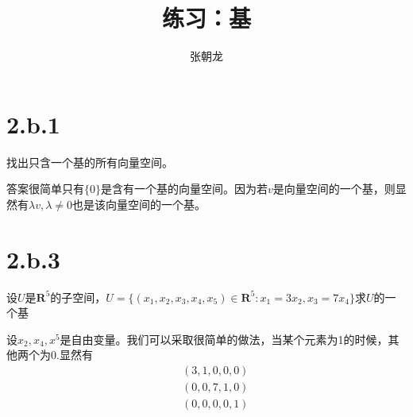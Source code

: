 \documentclass[10pt,a4paper,UTF8]{article}
\author{张朝龙}
\date{}
\title{练习：基}
\begin{document}
\maketitle
\tableofcontents
{}


\section*{2.b.1}
\label{sec:orgeb37aa7}


\begin{problem}
找出只含一个基的所有向量空间。
\end{problem}

\begin{answer}
答案很简单只有\(\{0\}\)是含有一个基的向量空间。因为若\(v\)是向量空间的一个基，则显然有\(\lambda v,\lambda \neq 0\)也是该向量空间的一个基。
\end{answer}
\section*{2.b.3}
\label{sec:org1222308}


\begin{problem}
设\(U\)是\(\mathbf{R}^{5}\)的子空间，\(U=\{(x_{1},x_{2},x_{3},x_{4},x_{5})\in \mathbf{R}^{5}:x_{1}=3x_{2},x_{3}=7x_{4}\}\)求\(U\)的一个基
\end{problem}

\begin{answer}
设\(x_{2},x_{4},x^{5}\)是自由变量。我们可以采取很简单的做法，当某个元素为1的时候，其他两个为0.显然有
\begin{eqnarray*}
&&(3,1,0,0,0)\\
&&(0,0,7,1,0)\\
&&(0,0,0,0,1)
\end{eqnarray*}
\end{answer}
\end{document}
